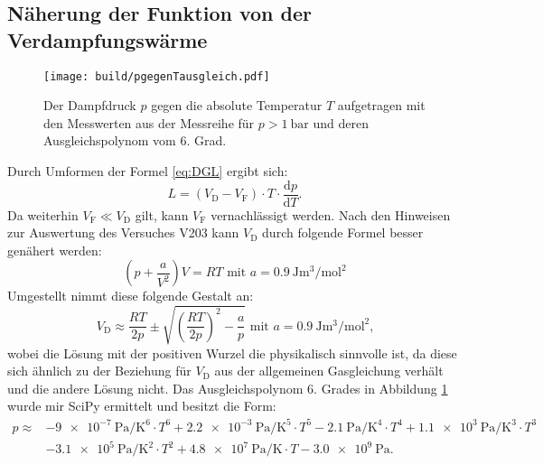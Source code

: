 \subsection{Näherung der Funktion von der Verdampfungswärme}

\begin{figure}
\centering
\caption{Der Dampfdruck $p$ gegen die absolute Temperatur $T$ aufgetragen mit den Messwerten aus der Messreihe für $p>\SI{1}{\bar}$ und deren Ausgleichspolynom vom 6. Grad.}
\texttt{[image: build/pgegenTausgleich.pdf]}
\label{fig:Graph3}
\end{figure}
Durch Umformen der Formel \eqref{eq:DGL} ergibt sich:
\begin{equation}
	L=(V_\text{D}-V_\text{F})\cdot T\cdot \frac{\text{d} p}{\text{d} T}\text{.}\label{eq:L}
\end{equation}
Da weiterhin $V_\text{F}\ll V_\text{D}$ gilt, kann $V_\text{F}$ vernachlässigt werden. Nach den Hinweisen zur Auswertung des Versuches V203 kann $V_\text{D}$ durch folgende Formel besser genähert werden:
\begin{equation}
	\left( p + \frac{a}{V^2}\right) V = R T \text{   mit }a=\SI{0.9}{\joule\meter\tothe{3}\per\mol\squared}
\end{equation}
Umgestellt nimmt diese folgende Gestalt an:
\begin{equation}
	V_\text{D} \approx \frac{R T}{2p} \pm \sqrt{\left(\frac{R T}{2p}\right)^2-\frac{a}{p}}\text{   mit }a=\SI{0.9}{\joule\meter\tothe{3}\per\mol\squared}\label{eq:VD}\text{,}
\end{equation}
wobei die Lösung mit der positiven Wurzel die physikalisch sinnvolle ist, da diese sich ähnlich zu der Beziehung für $V_\text{D}$ aus der allgemeinen Gasgleichung verhält und die andere Lösung nicht.
Das Ausgleichspolynom 6. Grades in Abbildung \ref{fig:Graph3} wurde mir SciPy \cite{scipy} ermittelt und besitzt die Form:
\begin{equation}
\begin{aligned}
p \approx &- \SI{9e-7}{\pascal\per\kelvin\tothe{6}} \cdot T^6 + \SI{2.2e-3}{\pascal\per\kelvin\tothe{5}} \cdot T^5 - \SI{2.1}{\pascal\per\kelvin\tothe{4}}\cdot T^4 + \SI{1.1e3}{\pascal\per\kelvin\tothe{3}} \cdot T^3 \\
&- \SI{3.1e5}{\pascal\per\kelvin\tothe{2}} \cdot T^2 + \SI{4.8e7}{\pascal\per\kelvin} \cdot T - \SI{3.0e9}{\pascal}\text{.}
\end{aligned}\label{eq:p}
\end{equation}
